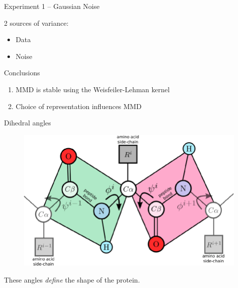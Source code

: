 \documentclass[aspectratio=169, 10pt, dvipsnames]{beamer}
\begin{document}
\begin{frame}[fragile]{Experiment 1 -- Gaussian Noise}
\begin{minipage}{0.38\linewidth}
    \pause\small 2 sources of variance:
    \begin{itemize}
      \pause\small\item Data
      \pause\small\item Noise
  \end{itemize}

  \begin{alert}{Conclusions}
    \begin{enumerate}
      \pause\item MMD is stable using the Weisfeiler-Lehman kernel
      \pause\item Choice of representation influences MMD
    \end{enumerate}
  \end{alert}
  \end{minipage}
\end{frame}


{
  \begin{frame}[fragile]{Dihedral angles}
    \begin{minipage}{0.7\textwidth}
      \begin{figure}
        \centering
        \includegraphics[width=\textwidth]{./figures/phi_psi.png}
      \end{figure}
    \end{minipage}
    \hfill
    \begin{minipage}{0.25\textwidth}
      \small These angles \emph{define} the shape of the protein.
    \end{minipage}
  \end{frame}
}
\end{document}
